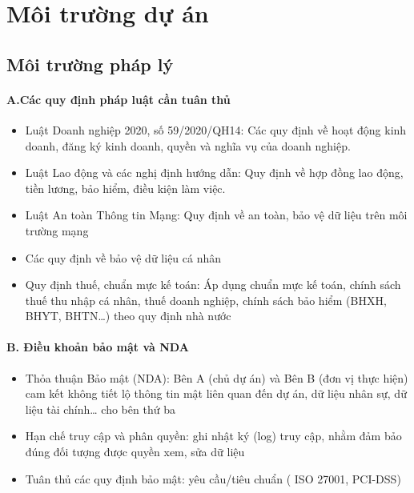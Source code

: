 
\section{Môi trường dự án}
\subsection{Môi trường pháp lý}
\paragraph{A.Các quy định pháp luật cần tuân thủ}
\begin{itemize}
    \item Luật Doanh nghiệp 2020, số 59/2020/QH14: Các quy định về hoạt động kinh doanh, đăng ký kinh doanh, quyền và nghĩa vụ của doanh nghiệp.
    \item Luật Lao động và các nghị định hướng dẫn: Quy định về hợp đồng lao động, tiền lương, bảo hiểm, điều kiện làm việc.
    \item Luật An toàn Thông tin Mạng: Quy định về an toàn, bảo vệ dữ liệu trên môi trường mạng
    \item Các quy định về bảo vệ dữ liệu cá nhân
    \item Quy định thuế, chuẩn mực kế toán: Áp dụng chuẩn mực kế toán, chính sách thuế thu nhập cá nhân, thuế doanh nghiệp, chính sách bảo hiểm (BHXH, BHYT, BHTN…) theo quy định nhà nước
\end{itemize}

\paragraph{B. Điều khoản bảo mật và NDA}
\begin{itemize}
    \item Thỏa thuận Bảo mật (NDA): Bên A (chủ dự án) và Bên B (đơn vị thực hiện) cam kết không tiết lộ thông tin mật liên quan đến dự án, dữ liệu nhân sự, dữ liệu tài chính… cho bên thứ ba
    \item Hạn chế truy cập và phân quyền: ghi nhật ký (log) truy cập, nhằm đảm bảo đúng đối tượng được quyền xem, sửa dữ liệu
    \item Tuân thủ các quy định bảo mật: yêu cầu/tiêu chuẩn ( ISO 27001, PCI-DSS)
\end{itemize}

